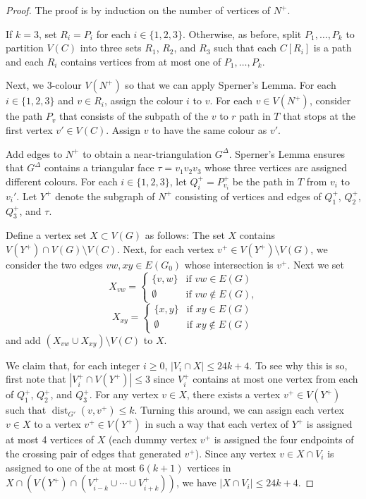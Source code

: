 \documentclass{patmorin}
\DeclareMathOperator{\dist}{dist}
\begin{document}
\begin{proof}
  The proof is by induction on the number of vertices of $N^+$.

  If $k=3$, set $R_i=P_i$ for each $i\in\{1,2,3\}$.  Otherwise, as before, split $P_1,\ldots,P_k$ to partition $V(C)$ into three sets $R_1$, $R_2$, and $R_3$ such that each $C[R_i]$ is a path and each $R_i$ contains vertices from at most one of $P_1,\ldots,P_k$. 
  
  Next, we 3-colour $V(N^+)$ so that we can apply Sperner's Lemma.
  For each $i\in\{1,2,3\}$ and $v\in R_i$, assign the colour $i$ to $v$.
  For each $v\in V(N^+)$, consider the path $P_v$ that consists of the subpath of the $v$ to $r$ path in $T$ that stops at the first vertex $v'\in V(C)$. Assign $v$ to have the same colour as $v'$.
  
  Add edges to $N^+$ to obtain a near-triangulation $G^\Delta$.  
  Sperner's Lemma ensures that $G^\Delta$ contains a triangular face $\tau=v_1v_2v_3$ whose three vertices are assigned different colours. For each $i\in\{1,2,3\}$, let $Q_i^+=P_{v_i}^+$ be the path in $T$ from $v_i$ to $v_i'$.  Let $Y^+$ denote the subgraph of $N^+$ consisting of vertices and edges of $Q_1^+$, $Q_2^+$, $Q_3^+$, and $\tau$.
  
  Define a vertex set $X\subset V(G)$ as follows:  The set $X$ contains $V(Y^+)\cap V(G)\setminus V(C)$.  Next, for each vertex $v^+\in V(Y^+)\setminus V(G)$, we consider the two edges $vw,xy\in E(G_0)$ whose intersection is $v^+$.  Next we set
  \[   X_{vw} = \begin{cases} \{v,w\} & \text{if $vw\in E(G)$} \\
           \emptyset & \text{if $vw\not\in E(G)$,}
         \end{cases}
  \]
  \[   X_{xy} = \begin{cases} \{x,y\} & \text{if $xy\in E(G)$} \\
           \emptyset & \text{if $xy\not\in E(G)$} 
         \end{cases}
  \]
  and add $(X_{vw}\cup X_{xy})\setminus V(C)$ to $X$.

  We claim that, for each integer $i\ge 0$, $|V_i\cap X|\le 24k+4$.  To see why this is so, first note that $|V_i^+\cap V(Y^+)|\le 3$ since $V_i^+$ contains at most one vertex from each of $Q_1^+$, $Q_2^+$, and $Q_3^+$. For any vertex $v\in X$, there exists a vertex $v^+\in V(Y^+)$ such that $\dist_{G'}(v,v^+)\le k$.  Turning this around, we can assign each vertex $v\in X$ to a vertex $v^+\in V(Y^+)$ in such a way that each vertex of $Y^+$ is assigned at most 4 vertices of $X$ (each dummy vertex $v^+$ is assigned the four endpoints of the crossing pair of edges that generated $v^+$).  Since any vertex $v\in X\cap V_i$ is assigned to one of the at most $6(k+1)$ vertices in $X\cap (V(Y^+)\cap( V_{i-k}^+\cup\cdots\cup V_{i+k}^+))$, we have $|X\cap V_i|\le 24k+4$.


\end{proof}
\end{document}
